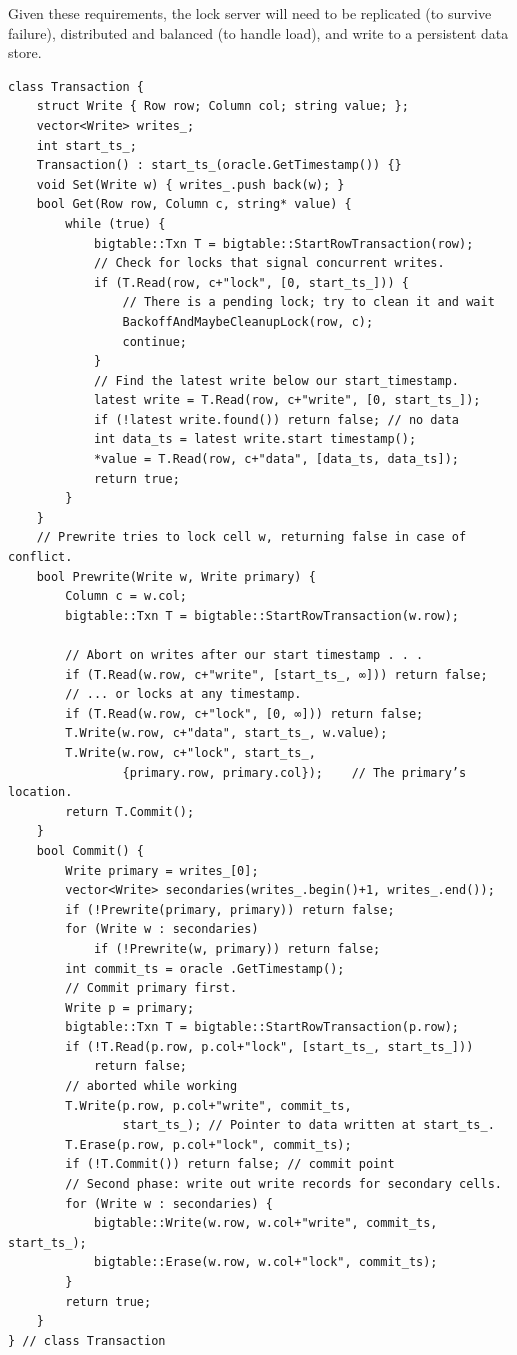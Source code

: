 \documentclass[11pt]{article}
\begin{document}
Given these requirements, the lock server will need to be replicated (to survive failure), distributed
and balanced (to handle load), and write to a persistent data store.

\begin{verbatim}
class Transaction {
    struct Write { Row row; Column col; string value; };
    vector<Write> writes_;
    int start_ts_;
    Transaction() : start_ts_(oracle.GetTimestamp()) {}
    void Set(Write w) { writes_.push back(w); }
    bool Get(Row row, Column c, string* value) {
        while (true) {
            bigtable::Txn T = bigtable::StartRowTransaction(row);
            // Check for locks that signal concurrent writes.
            if (T.Read(row, c+"lock", [0, start_ts_])) {
                // There is a pending lock; try to clean it and wait
                BackoffAndMaybeCleanupLock(row, c);
                continue;
            }
            // Find the latest write below our start_timestamp.
            latest write = T.Read(row, c+"write", [0, start_ts_]);
            if (!latest write.found()) return false; // no data
            int data_ts = latest write.start timestamp();
            *value = T.Read(row, c+"data", [data_ts, data_ts]);
            return true;
        }
    }
    // Prewrite tries to lock cell w, returning false in case of conflict.
    bool Prewrite(Write w, Write primary) {
        Column c = w.col;
        bigtable::Txn T = bigtable::StartRowTransaction(w.row);

        // Abort on writes after our start timestamp . . .
        if (T.Read(w.row, c+"write", [start_ts_, ∞])) return false;
        // ... or locks at any timestamp.
        if (T.Read(w.row, c+"lock", [0, ∞])) return false;
        T.Write(w.row, c+"data", start_ts_, w.value);
        T.Write(w.row, c+"lock", start_ts_,
                {primary.row, primary.col});    // The primary’s location.
        return T.Commit();
    }
    bool Commit() {
        Write primary = writes_[0];
        vector<Write> secondaries(writes_.begin()+1, writes_.end());
        if (!Prewrite(primary, primary)) return false;
        for (Write w : secondaries)
            if (!Prewrite(w, primary)) return false;
        int commit_ts = oracle .GetTimestamp();
        // Commit primary first.
        Write p = primary;
        bigtable::Txn T = bigtable::StartRowTransaction(p.row);
        if (!T.Read(p.row, p.col+"lock", [start_ts_, start_ts_]))
            return false;
        // aborted while working
        T.Write(p.row, p.col+"write", commit_ts,
                start_ts_); // Pointer to data written at start_ts_.
        T.Erase(p.row, p.col+"lock", commit_ts);
        if (!T.Commit()) return false; // commit point
        // Second phase: write out write records for secondary cells.
        for (Write w : secondaries) {
            bigtable::Write(w.row, w.col+"write", commit_ts, start_ts_);
            bigtable::Erase(w.row, w.col+"lock", commit_ts);
        }
        return true;
    }
} // class Transaction
\end{verbatim}
\end{document}
